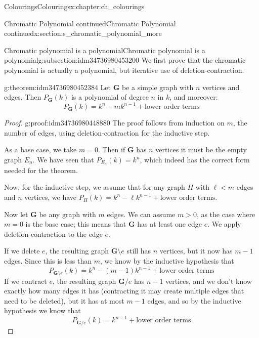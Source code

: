 \documentclass[oneside,10pt,]{book}
\numberwithin{equation}{section}
\newcommand{\bfG}{\mathbf{G}}
\newcommand{\lt}{<}
\newcommand{\gt}{>}
\begin{document}
\begin{chapterptx}{Colourings}{}{Colourings}{}{}{x:chapter:ch_colourings}
\begin{sectionptx}{Chromatic Polynomial continued}{}{Chromatic Polynomial continued}{}{}{x:section:s_chromatic_polynomial_more}
\typeout{************************************************}
%
\begin{subsectionptx}{Chromatic polynomial is a polynomial}{}{Chromatic polynomial is a polynomial}{}{}{g:subsection:idm34736980453200}
We first prove that the chromatic polynomial is actually a polynomial, but iterative use of deletion-contraction.%
\begin{theorem}{}{}{g:theorem:idm34736980452384}%
Let \(\bfG\) be a simple graph with \(n\) vertices and \(\) edges.  Then \(P_\bfG(k)\) is a polynomial of degree \(n\) in \(k\), and moreover:%
%
\begin{equation*}
P_\bfG(k)=k^n-mk^{n-1}+\text{lower order terms}
\end{equation*}
\end{theorem}
\begin{proof}{}{g:proof:idm34736980448880}
The proof follows from induction on \(m\), the number of edges, using deletion-contraction for the inductive step.%
\par
As a base case, we take \(m=0\).  Then if \(\bfG\) has \(n\) vertices it must be the empty graph \(E_n\).  We have seen that \(P_{E_n}(k)=k^n\), which indeed has the correct form needed for the theorem.%
\par
Now, for the inductive step, we assume that for any graph \(H\) with \(\ell\lt m\) edges and \(n\) vertices, we have \(P_{H}(k)=k^n-\ell k^{n-1}+\text{lower order terms}\).%
\par
Now let \(\bfG\) be any graph with \(m\) edges.  We can assume \(m\gt 0\), as the case where \(m=0\) is the base case; this means that \(\bfG\) has at least one edge \(e\).  We apply deletion-contraction to the edge \(e\).%
\par
If we delete \(e\), the resulting graph \(\bfG\setminus e\) still has \(n\) vertices, but it now has \(m-1\) edges.  Since this is less than \(m\), we know by the inductive hypothesis that%
%
\begin{equation*}
P_{\bfG\setminus e}(k)=k^n-(m-1)k^{n-1}+\text{lower order terms}
\end{equation*}
If we contract \(e\), the resulting graph \(\bfG/e\) has \(n-1\) vertices, and we don't know exactly how many edges it has (contracting it may create multiple edges that need to be deleted), but it has at most \(m-1\) edges, and so by the inductive hypothesis we know that%
%
\begin{equation*}
P_{\bfG/e}(k)=k^{n-1}+\text{lower order terms}

\end{equation*}
\end{proof}
\end{subsectionptx}
\end{sectionptx}
\end{chapterptx}
\end{document}
